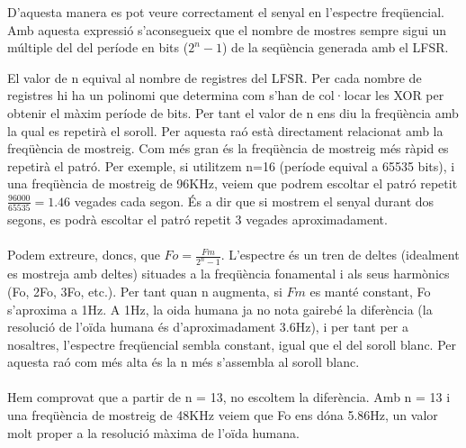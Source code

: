 \documentclass[11pt]{report}
\begin{document}
D'aquesta manera es pot veure correctament el senyal en l'espectre freqüencial. Amb aquesta expressió s'aconsegueix que el nombre de mostres sempre sigui un múltiple del del període en bits ($2^n - 1$) de la seqüència generada amb el LFSR.

El valor de n equival al nombre de registres del LFSR. Per cada nombre de registres hi ha un polinomi que determina com s'han de col·locar les XOR per obtenir el màxim període de bits. Per tant el valor de n ens diu la freqüència amb la qual es repetirà el soroll. Per aquesta raó està directament relacionat amb la freqüència de mostreig. Com més gran és la freqüència de mostreig més ràpid es repetirà el patró. Per exemple, si utilitzem n=16 (període equival a 65535 bits), i una freqüència de mostreig de 96KHz, veiem que podrem escoltar el patró repetit $\frac{96000}{65535}=1.46$ vegades cada segon. És a dir que si mostrem el senyal durant dos segons, es podrà escoltar el patró repetit 3 vegades aproximadament.
\paragraph{}
Podem extreure, doncs, que $Fo=\frac{Fm}{2^n-1}$. L'espectre és un tren de deltes (idealment es mostreja amb deltes) situades a la freqüència fonamental i als seus harmònics (Fo, 2Fo, 3Fo, etc.). Per tant quan n augmenta, si $Fm$ es manté constant, Fo s'aproxima a 1Hz. A 1Hz, la oida humana ja no nota gairebé la diferència (la resolució de l'oïda humana és d'aproximadament 3.6Hz), i per tant per a nosaltres, l'espectre freqüencial sembla constant, igual que el del soroll blanc. Per aquesta raó com més alta és la n més s'assembla al soroll blanc.
\paragraph{}
Hem comprovat que a partir de n = 13, no escoltem la diferència. Amb n = 13 i una freqüència de mostreig de 48KHz veiem que Fo ens dóna 5.86Hz, un valor molt proper a la resolució màxima de l'oïda humana.
\end{document}
